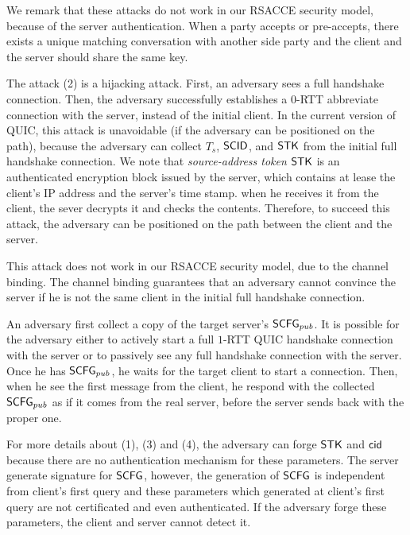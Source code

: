We remark that these attacks do not work in our RSACCE security model, because of
the server authentication.
When a party accepts or pre-accepts,  there exists a unique matching conversation with another side party
and the client and the server should share the same key.

The attack  (2) is a hijacking attack. First, an adversary sees a full handshake connection.
Then, the adversary successfully establishes a $0$-RTT abbreviate connection with the server,
instead of the initial client.
In the current version of QUIC, this attack is unavoidable (if the adversary can be positioned on the path),
because the adversary can collect $T_s$, $\mathsf{SCID}$, and $\mathsf{STK}$ from the initial full handshake connection.
We note that \textit{source-address token} $\mathsf{STK}$ is an authenticated encryption block issued by the server,
which contains at lease the client's IP address and the server's time stamp.
when he receives it from the client, the sever decrypts it and checks the contents.
Therefore, to succeed this attack, the adversary can be positioned on the path between the client and the server.

This attack does not work in our RSACCE security model, due to the channel binding.
The channel binding guarantees that an adversary cannot convince the server if he is not the same client in
the initial full handshake connection.

An adversary first collect a copy of the target server's
$\mathsf{SCFG}_{pub}$. It is possible for the adversary either to actively start a full $1$-RTT QUIC handshake connection with the server or to passively see any full handshake connection with the server.
Once he has $\mathsf{SCFG}_{pub}$, he waits for the target client to start a connection.
Then, when he see the first message from the client, he respond with the collected $\mathsf{SCFG}_{pub}$
as if it comes from the real server, before the server sends back with the proper one.
\fi

For more details about (1), (3) and (4), the adversary can forge
$\mathsf{STK}$ and $\mathsf{cid}$ because there are no authentication mechanism
for these parameters.
The server generate signature for $\mathsf{SCFG}$, however, the generation
of $\mathsf{SCFG}$ is independent from client's first query and these parameters
which generated at client's first query
are not certificated and even authenticated.
If the adversary forge these parameters, the client and server cannot
detect it.

